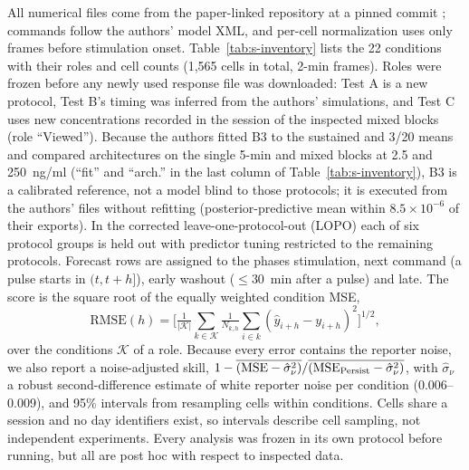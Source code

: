\documentclass[conference]{IEEEtran}
\begin{document}
All numerical files come from the paper-linked repository at a pinned commit \cite{lfnsrepo,mendeley2020}; commands follow the authors' model XML, and per-cell normalization uses only frames before stimulation onset. Table~\ref{tab:s-inventory} lists the 22 conditions with their roles and cell counts (1,565 cells in total, 2-min frames). Roles were frozen before any newly used response file was downloaded: Test A is a new protocol, Test B's timing was inferred from the authors' simulations, and Test C uses new concentrations recorded in the session of the inspected mixed blocks (role ``Viewed''). Because the authors fitted B3 to the sustained and 3/20 means and compared architectures on the single 5-min and mixed blocks at 2.5 and 250~ng/ml (``fit'' and ``arch.'' in the last column of Table~\ref{tab:s-inventory}), B3 is a calibrated reference, not a model blind to those protocols; it is executed from the authors' files without refitting (posterior-predictive mean within $8.5\times10^{-6}$ of their exports). In the corrected leave-one-protocol-out (LOPO) each of six protocol groups is held out with predictor tuning restricted to the remaining protocols. Forecast rows are assigned to the phases stimulation, next command (a pulse starts in $(t,t+h]$), early washout ($\le30$~min after a pulse) and late. The score is the square root of the equally weighted condition MSE,
\begin{equation}
 \mathrm{RMSE}(h)=\Big[\tfrac{1}{|\mathcal{K}|}\textstyle\sum_{k\in\mathcal{K}}\tfrac{1}{N_{k,h}}\sum_{i\in k}(\hat y_{i+h}-y_{i+h})^2\Big]^{1/2},
 \label{eq:s-score}
\end{equation}
over the conditions $\mathcal{K}$ of a role. Because every error contains the reporter noise, we also report a noise-adjusted skill, $1-\overline{(\mathrm{MSE}-\hat\sigma_\nu^2)}/\overline{(\mathrm{MSE}_{\rm Persist}-\hat\sigma_\nu^2)}$, with $\hat\sigma_\nu$ a robust second-difference estimate of white reporter noise per condition (0.006--0.009), and 95\% intervals from resampling cells within conditions. Cells share a session and no day identifiers exist, so intervals describe cell sampling, not independent experiments. Every analysis was frozen in its own protocol before running, but all are post hoc with respect to inspected data.

\begin{table}[t]
\caption{Protocols, roles and cells (``fit'' and ``arch.'': B3 fitting and architecture comparison by the original authors).}
\label{tab:s-inventory}
\centering\footnotesize\setlength{\tabcolsep}{3pt}

\end{table}
\end{document}
